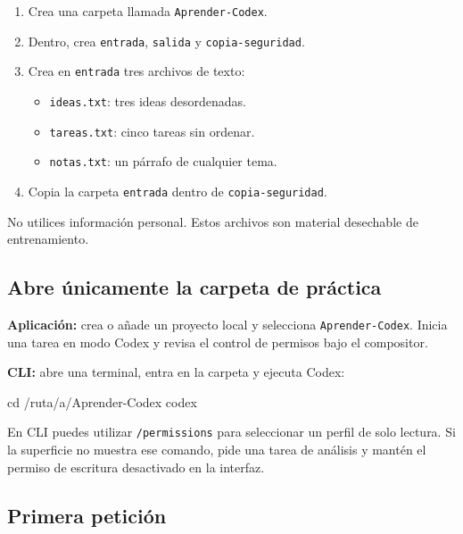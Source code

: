 \documentclass[10pt,a4paper,openany]{book}
\providecommand{\tightlist}{\setlength{\itemsep}{0.18em}\setlength{\parskip}{0pt}}
\newenvironment{Shaded}{}{}
\newcommand{\BuiltInTok}[1]{\textcolor[rgb]{0.00,0.50,0.00}{#1}}
\newcommand{\ExtensionTok}[1]{#1}
\newcommand{\NormalTok}[1]{#1}
\renewenvironment{Shaded}
  {\begin{tcolorbox}[
    enhanced,
    breakable,
    colback=CodeBg,
    colframe=Border,
    boxrule=0.5pt,
    arc=2mm,
    left=3mm,
    right=3mm,
    top=2.2mm,
    bottom=2.2mm,
    before skip=0.8em,
    after skip=0.9em
  ]}
  {\end{tcolorbox}}
\begin{document}
\begin{enumerate}
\def\labelenumi{\arabic{enumi}.}
\tightlist
\item
  Crea una carpeta llamada \texttt{Aprender-Codex}.
\item
  Dentro, crea \texttt{entrada}, \texttt{salida} y
  \texttt{copia-seguridad}.
\item
  Crea en \texttt{entrada} tres archivos de texto:

  \begin{itemize}
  \tightlist
  \item
    \texttt{ideas.txt}: tres ideas desordenadas.
  \item
    \texttt{tareas.txt}: cinco tareas sin ordenar.
  \item
    \texttt{notas.txt}: un párrafo de cualquier tema.
  \end{itemize}
\item
  Copia la carpeta \texttt{entrada} dentro de \texttt{copia-seguridad}.
\end{enumerate}

No utilices información personal. Estos archivos son material desechable
de entrenamiento.

\subsection{Abre únicamente la carpeta de
práctica}\label{abre-uxfanicamente-la-carpeta-de-pruxe1ctica}

\textbf{Aplicación:} crea o añade un proyecto local y selecciona
\texttt{Aprender-Codex}. Inicia una tarea en modo Codex y revisa el
control de permisos bajo el compositor.

\textbf{CLI:} abre una terminal, entra en la carpeta y ejecuta Codex:

\begin{Shaded}
\begin{Highlighting}[]
\BuiltInTok{cd}\NormalTok{ /ruta/a/Aprender{-}Codex}
\ExtensionTok{codex}
\end{Highlighting}
\end{Shaded}

En CLI puedes utilizar \texttt{/permissions} para seleccionar un perfil
de solo lectura. Si la superficie no muestra ese comando, pide una tarea
de análisis y mantén el permiso de escritura desactivado en la interfaz.

\subsection{Primera petición}\label{primera-peticiuxf3n}
\end{document}
